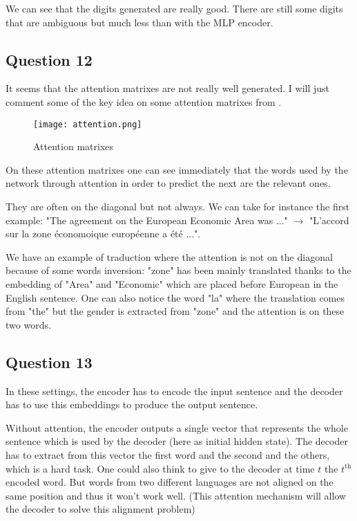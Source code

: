 \documentclass{article}
\begin{document}
We can see that the digits generated are really good. There are still some digits that are ambiguous but much less than with the MLP encoder.


\subsection*{Question 12}
It seems that the attention matrixes are not really well generated. I will just comment some of the key idea on some attention matrixes
from \cite{attention}.

\begin{figure}[h!]
    \centering
    \texttt{[image: attention.png]}
    \caption{Attention matrixes \cite{attention}}
    \label{fig:attention}
\end{figure}

On these attention matrixes one can see immediately that the words used by the network through attention in order to predict the next
are the relevant ones.

They are often on the diagonal but not always. We can take for instance the first example:
"The agreement on the European Economic Area was ..." $\rightarrow$ "L'accord sur la zone économoique européenne a été ...".

We have an example of traduction where the attention is not on the diagonal because of some words inversion: "zone" has been mainly
translated thanks to the embedding of "Area" and "Economic" which are placed before European in the English sentence.
One can also notice the word "la" where the translation comes from "the" but the gender is extracted from "zone" and the attention is
on these two words.


\subsection*{Question 13}

In these settings, the encoder has to encode the input sentence and the decoder has to use this embeddings to produce the output sentence.

Without attention, the encoder outputs a single vector that represents the whole sentence which is used by the decoder (here as initial hidden
state). The decoder has to extract from this vector the first word and the second and the others, which is a hard task. One could also think
to give to the decoder at time $t$ the $t^\text{th}$ encoded word. But words from two different languages are not aligned on the same
position and thus it won't work well. (This attention mechanism will allow the decoder to solve this alignment problem)
\end{document}

